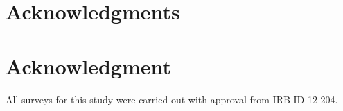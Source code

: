 \ifCLASSOPTIONcompsoc
  \section*{Acknowledgments}
\else
  \section*{Acknowledgment}
\fi


All surveys for this study were carried out with approval from  IRB-ID 12-204.


\ifCLASSOPTIONcaptionsoff
  \newpage
\fi







%
%
%
%
%
%
%

